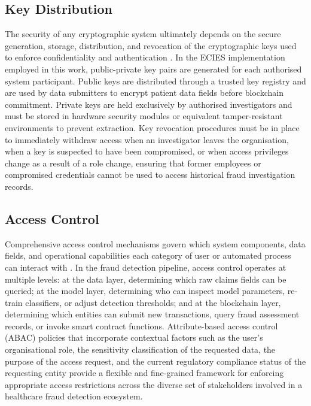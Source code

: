 \subsection{Key Distribution}

The security of any cryptographic system ultimately depends on the secure generation, storage, distribution, and revocation of the cryptographic keys used to enforce confidentiality and authentication \cite{ahmadian2020}. In the ECIES implementation employed in this work, public-private key pairs are generated for each authorised system participant. Public keys are distributed through a trusted key registry and are used by data submitters to encrypt patient data fields before blockchain commitment. Private keys are held exclusively by authorised investigators and must be stored in hardware security modules or equivalent tamper-resistant environments to prevent extraction. Key revocation procedures must be in place to immediately withdraw access when an investigator leaves the organisation, when a key is suspected to have been compromised, or when access privileges change as a result of a role change, ensuring that former employees or compromised credentials cannot be used to access historical fraud investigation records.

\subsection{Access Control}

Comprehensive access control mechanisms govern which system components, data fields, and operational capabilities each category of user or automated process can interact with \cite{gerke2019}. In the fraud detection pipeline, access control operates at multiple levels: at the data layer, determining which raw claims fields can be queried; at the model layer, determining who can inspect model parameters, re-train classifiers, or adjust detection thresholds; and at the blockchain layer, determining which entities can submit new transactions, query fraud assessment records, or invoke smart contract functions. Attribute-based access control (ABAC) policies that incorporate contextual factors such as the user's organisational role, the sensitivity classification of the requested data, the purpose of the access request, and the current regulatory compliance status of the requesting entity provide a flexible and fine-grained framework for enforcing appropriate access restrictions across the diverse set of stakeholders involved in a healthcare fraud detection ecosystem.

